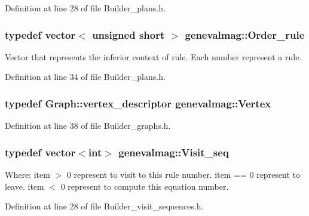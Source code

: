 Definition at line 28 of file Builder\_\-plans.h.

\hypertarget{namespacegenevalmag_aed20da32fb9692645ae53d911d274fd5}{
\subsubsection[{Order\_\-rule}]{\setlength{\rightskip}{0pt plus 5cm}typedef vector$<$ unsigned short $>$ {\bf genevalmag::Order\_\-rule}}}
\label{namespacegenevalmag_aed20da32fb9692645ae53d911d274fd5}
Vector that represents the inferior context of rule. Each number represent a rule. 

Definition at line 34 of file Builder\_\-plans.h.

\hypertarget{namespacegenevalmag_a2aae7b018fc2a9afae131bbf639181b5}{
\subsubsection[{Vertex}]{\setlength{\rightskip}{0pt plus 5cm}typedef Graph::vertex\_\-descriptor {\bf genevalmag::Vertex}}}
\label{namespacegenevalmag_a2aae7b018fc2a9afae131bbf639181b5}


Definition at line 38 of file Builder\_\-graphs.h.

\hypertarget{namespacegenevalmag_a7720677d79b33ecca4db21cdbcf7908f}{
\subsubsection[{Visit\_\-seq}]{\setlength{\rightskip}{0pt plus 5cm}typedef vector$<$int$>$ {\bf genevalmag::Visit\_\-seq}}}
\label{namespacegenevalmag_a7720677d79b33ecca4db21cdbcf7908f}
Where: item $>$ 0 represent to visit to this rule number. item == 0 represent to leave. item $<$ 0 represent to compute this equation number. 

Definition at line 28 of file Builder\_\-visit\_\-sequences.h.



